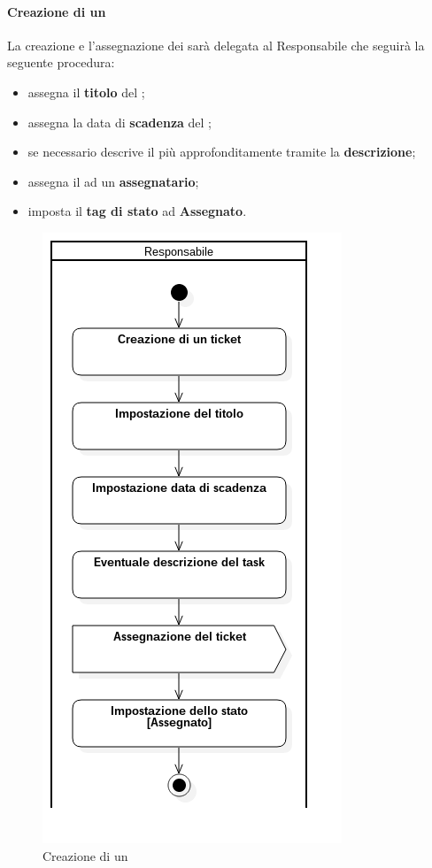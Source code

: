 	\paragraph{Creazione di un }
	La creazione e l'assegnazione dei  sarà delegata al Responsabile che seguirà la seguente procedura:
	\begin{itemize}
		\item assegna il \textbf{titolo} del ;
		\item assegna la data di \textbf{scadenza} del ;
		\item se necessario descrive il  più approfonditamente tramite la \textbf{descrizione};
		\item assegna il  ad un \textbf{assegnatario};
		\item imposta il \textbf{tag di stato} ad \textbf{Assegnato}.
	\end{itemize}
	\begin{figure}
		\centering
		\includegraphics[scale=0.80]{img/creazioneTicket.png}
		\caption{Creazione di un }
	\end{figure}
